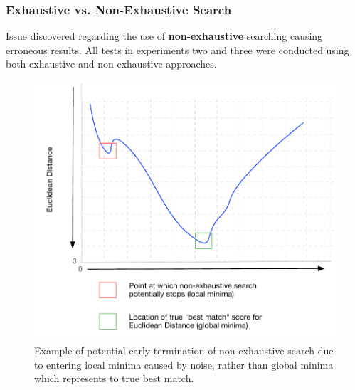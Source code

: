 \documentclass[10pt, compress]{beamer}
\begin{document}
\begin{frame}[fragile]
  \frametitle{Exhaustive vs. Non-Exhaustive Search}
  
  \vspace{-10pt}
  
  Issue discovered regarding the use of \textbf{non-exhaustive} searching causing erroneous results. All tests in experiments two and three were conducted using both exhaustive and non-exhaustive approaches.
  
  \vspace{-10pt}

  \begin{figure}[ht!]
\centering
\includegraphics[scale=0.32]{ed}
 \vspace{-5pt}
\caption{Example of potential early termination of non-exhaustive search due to entering local minima caused by noise, rather than global minima which represents to true best match.}
\end{figure}

\end{frame}
\end{document}
